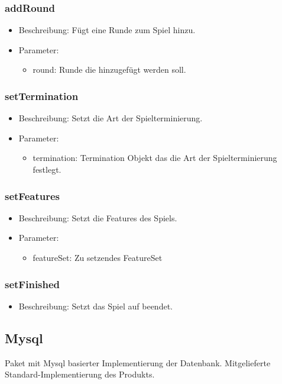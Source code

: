 \documentclass[a4paper]{scrreprt}
\begin{document}
	\subsubsection{addRound}
	\begin{itemize}
		\item Beschreibung: Fügt eine Runde zum Spiel hinzu.
		\item Parameter:
		\begin{itemize}
			\item round: Runde die hinzugefügt werden soll.
		\end{itemize}
	\end{itemize}

	\subsubsection{setTermination}
	\begin{itemize}
		\item Beschreibung: Setzt die Art der Spielterminierung.
		\item Parameter:
		\begin{itemize}
			\item termination: Termination Objekt das die Art der Spielterminierung festlegt.
		\end{itemize}
	\end{itemize}

	\subsubsection{setFeatures}
	\begin{itemize}
		\item Beschreibung: Setzt die Features des Spiels.
		\item Parameter:
		\begin{itemize}
			\item featureSet: Zu setzendes FeatureSet
		\end{itemize}
	\end{itemize}

	\subsubsection{setFinished}
	\begin{itemize}
		\item Beschreibung: Setzt das Spiel auf beendet.
	\end{itemize}

	\subsection{Mysql}
	Paket mit Mysql basierter Implementierung der Datenbank.
	Mitgelieferte Standard-Implementierung des Produkts.
\end{document}
